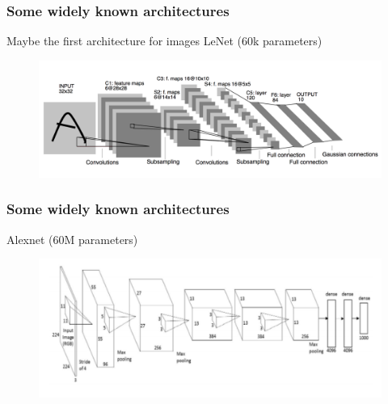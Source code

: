 \documentclass[french,9pt]{beamer}
\begin{document}

\begin{frame}
\frametitle{Some widely known architectures}

Maybe the first architecture for images LeNet (60k parameters) \cite{LeCun1989} 

\begin{figure}
  \begin{center}
    \includegraphics[width=1\textwidth]{fig/conv_lecun.png}
  \end{center}
\end{figure}


\end{frame}


\begin{frame}
\frametitle{Some widely known architectures}

Alexnet (60M parameters) \cite{alexnet} 

\begin{figure}
  \begin{center}
    \includegraphics[width=1\textwidth]{fig/alexnet.png}
  \end{center}
\end{figure}


\end{frame}

\end{document}

